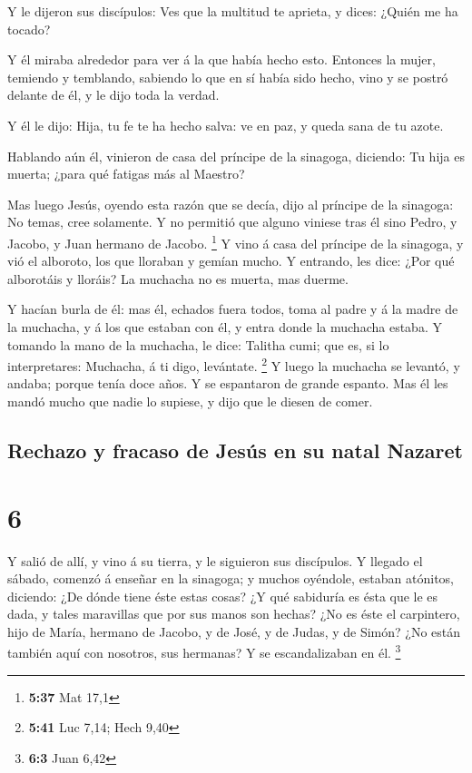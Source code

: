  Y le dijeron sus discípulos: Ves que la multitud te
aprieta, y dices: ¿Quién me ha tocado?

 Y él miraba alrededor para ver á la que había hecho esto.
 Entonces la mujer, temiendo y temblando, sabiendo lo que
en sí había sido hecho, vino y se postró delante de él, y le dijo toda
la verdad.

 Y él le dijo: Hija, tu fe te ha hecho salva: ve en paz, y
queda sana de tu azote.

 Hablando aún él, vinieron de casa del príncipe de la
sinagoga, diciendo: Tu hija es muerta; ¿para qué fatigas más al Maestro?

 Mas luego Jesús, oyendo esta razón que se decía, dijo al
príncipe de la sinagoga: No temas, cree solamente.  Y no
permitió que alguno viniese tras él sino Pedro, y Jacobo, y Juan hermano
de Jacobo. \footnote{\textbf{5:37} Mat 17,1}  Y vino á casa
del príncipe de la sinagoga, y vió el alboroto, los que lloraban y
gemían mucho.  Y entrando, les dice: ¿Por qué alborotáis y
lloráis? La muchacha no es muerta, mas duerme.

 Y hacían burla de él: mas él, echados fuera todos, toma al
padre y á la madre de la muchacha, y á los que estaban con él, y entra
donde la muchacha estaba.  Y tomando la mano de la
muchacha, le dice: Talitha cumi; que es, si lo interpretares: Muchacha,
á ti digo, levántate. \footnote{\textbf{5:41} Luc 7,14; Hech 9,40}
 Y luego la muchacha se levantó, y andaba; porque tenía
doce años. Y se espantaron de grande espanto.  Mas él les
mandó mucho que nadie lo supiese, y dijo que le diesen de comer.

\hypertarget{rechazo-y-fracaso-de-jesuxfas-en-su-natal-nazaret}{%
\subsection{Rechazo y fracaso de Jesús en su natal
Nazaret}\label{rechazo-y-fracaso-de-jesuxfas-en-su-natal-nazaret}}

\hypertarget{section-5}{%
\section{6}\label{section-5}}

 Y salió de allí, y vino á su tierra, y le siguieron sus
discípulos.  Y llegado el sábado, comenzó á enseñar en la
sinagoga; y muchos oyéndole, estaban atónitos, diciendo: ¿De dónde tiene
éste estas cosas? ¿Y qué sabiduría es ésta que le es dada, y tales
maravillas que por sus manos son hechas?  ¿No es éste el
carpintero, hijo de María, hermano de Jacobo, y de José, y de Judas, y
de Simón? ¿No están también aquí con nosotros, sus hermanas? Y se
escandalizaban en él. \footnote{\textbf{6:3} Juan 6,42}

